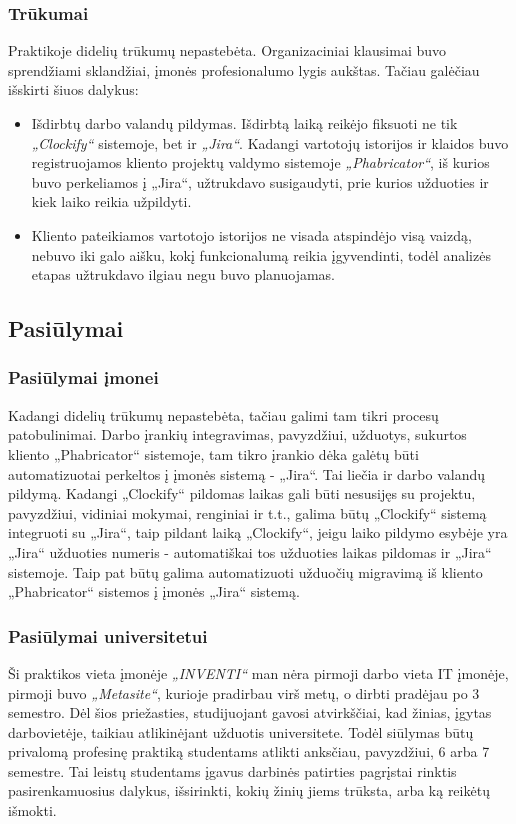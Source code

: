 \subsubsection{Trūkumai}
Praktikoje didelių trūkumų nepastebėta. Organizaciniai klausimai buvo sprendžiami sklandžiai, įmonės profesionalumo lygis aukštas. Tačiau galėčiau išskirti šiuos dalykus:
\medskip

\begin{itemize}
    \item Išdirbtų darbo valandų pildymas. Išdirbtą laiką reikėjo fiksuoti ne tik \textit{„Clockify“} sistemoje, bet ir \textit{„Jira“}. Kadangi vartotojų istorijos ir klaidos buvo registruojamos
    kliento projektų valdymo sistemoje \textit{„Phabricator“}, iš kurios buvo perkeliamos į „Jira“, užtrukdavo susigaudyti, prie kurios užduoties ir kiek laiko reikia užpildyti.
    \item Kliento pateikiamos vartotojo istorijos ne visada atspindėjo visą vaizdą, nebuvo iki galo aišku, kokį funkcionalumą reikia įgyvendinti, todėl analizės etapas užtrukdavo ilgiau
    negu buvo planuojamas.
\end{itemize}


\subsection{Pasiūlymai}

\subsubsection{Pasiūlymai įmonei}
Kadangi didelių trūkumų nepastebėta, tačiau galimi tam tikri procesų patobulinimai. Darbo įrankių integravimas, pavyzdžiui, užduotys, sukurtos kliento „Phabricator“ sistemoje,
tam tikro įrankio dėka galėtų būti automatizuotai perkeltos į įmonės sistemą - „Jira“. Tai liečia ir darbo valandų pildymą. Kadangi „Clockify“ pildomas laikas
gali būti nesusijęs su projektu, pavyzdžiui, vidiniai mokymai, renginiai ir t.t., galima būtų „Clockify“ sistemą integruoti su „Jira“, taip pildant laiką „Clockify“,
jeigu laiko pildymo esybėje yra „Jira“ užduoties numeris - automatiškai tos užduoties laikas pildomas ir „Jira“ sistemoje.
Taip pat būtų galima automatizuoti užduočių migravimą iš kliento „Phabricator“ sistemos į įmonės „Jira“ sistemą.

\subsubsection{Pasiūlymai universitetui}
Ši praktikos vieta įmonėje \textit{„INVENTI“} man nėra pirmoji darbo vieta IT įmonėje, pirmoji buvo  \textit{„Metasite“}, kurioje pradirbau virš metų, o dirbti pradėjau
po 3 semestro. Dėl šios priežasties, studijuojant gavosi atvirkščiai, kad žinias, įgytas darbovietėje, taikiau atlikinėjant užduotis universitete.
Todėl siūlymas būtų privalomą profesinę praktiką studentams atlikti anksčiau, pavyzdžiui, 6 arba 7 semestre. Tai leistų studentams įgavus darbinės patirties
pagrįstai rinktis pasirenkamuosius dalykus, išsirinkti, kokių žinių jiems trūksta, arba ką reikėtų išmokti.

